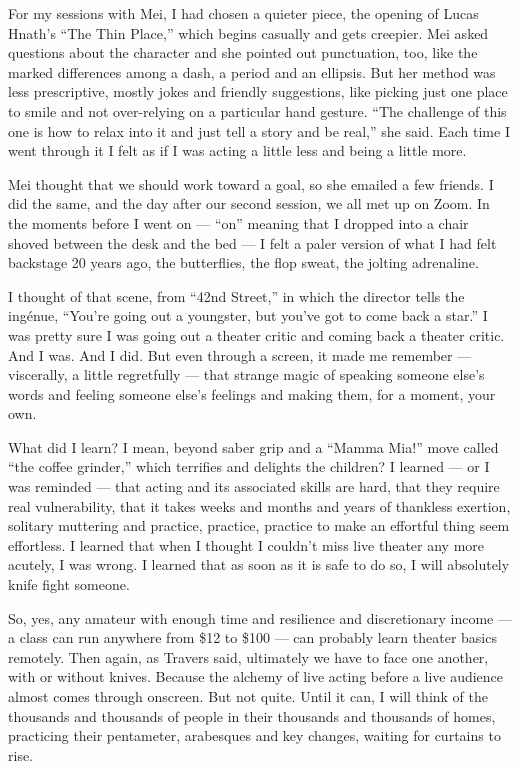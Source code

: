 For my sessions with Mei, I had chosen a quieter piece, the opening of
Lucas Hnath's ``The Thin Place,'' which begins casually and gets
creepier. Mei asked questions about the character and she pointed out
punctuation, too, like the marked differences among a dash, a period and
an ellipsis. But her method was less prescriptive, mostly jokes and
friendly suggestions, like picking just one place to smile and not
over-relying on a particular hand gesture. ``The challenge of this one
is how to relax into it and just tell a story and be real,'' she said.
Each time I went through it I felt as if I was acting a little less and
being a little more.

Mei thought that we should work toward a goal, so she emailed a few
friends. I did the same, and the day after our second session, we all
met up on Zoom. In the moments before I went on --- ``on'' meaning that
I dropped into a chair shoved between the desk and the bed --- I felt a
paler version of what I had felt backstage 20 years ago, the
butterflies, the flop sweat, the jolting adrenaline.

I thought of that scene, from ``42nd Street,'' in which the director
tells the ingénue, ``You're going out a youngster, but you've got to
come back a star.'' I was pretty sure I was going out a theater critic
and coming back a theater critic. And I was. And I did. But even through
a screen, it made me remember --- viscerally, a little regretfully ---
that strange magic of speaking someone else's words and feeling someone
else's feelings and making them, for a moment, your own.

What did I learn? I mean, beyond saber grip and a ``Mamma Mia!'' move
called ``the coffee grinder,'' which terrifies and delights the
children? I learned --- or I was reminded --- that acting and its
associated skills are hard, that they require real vulnerability, that
it takes weeks and months and years of thankless exertion, solitary
muttering and practice, practice, practice to make an effortful thing
seem effortless. I learned that when I thought I couldn't miss live
theater any more acutely, I was wrong. I learned that as soon as it is
safe to do so, I will absolutely knife fight someone.

So, yes, any amateur with enough time and resilience and discretionary
income --- a class can run anywhere from \$12 to \$100 --- can probably
learn theater basics remotely. Then again, as Travers said, ultimately
we have to face one another, with or without knives. Because the alchemy
of live acting before a live audience almost comes through onscreen. But
not quite. Until it can, I will think of the thousands and thousands of
people in their thousands and thousands of homes, practicing their
pentameter, arabesques and key changes, waiting for curtains to rise.

